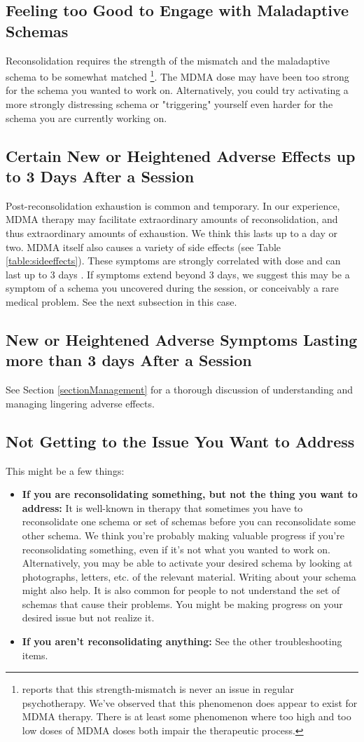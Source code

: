 \documentclass[12pt,letterpaper]{book}
\begin{document}
\subsection*{Feeling too Good to Engage with Maladaptive Schemas}
Reconsolidation requires the strength of the mismatch and the maladaptive schema to be somewhat matched \cite{eckerUnlocking}\footnote{\textcite{eckerUnlocking} reports that this strength-mismatch is never an issue in regular psychotherapy. We've observed that this phenomenon does appear to exist for MDMA therapy. There is at least some phenomenon where too high and too low doses of MDMA doses both impair the therapeutic process.}. The MDMA dose may have been too strong for the schema you wanted to work on. Alternatively, you could try activating a more strongly distressing schema or "triggering" yourself even harder for the schema you are currently working on.
\subsection*{Certain New or Heightened Adverse Effects up to 3 Days After a Session}
Post-reconsolidation exhaustion is common and temporary. In our experience, MDMA therapy may facilitate extraordinary amounts of reconsolidation, and thus extraordinary amounts of exhaustion. We think this lasts up to a day or two. MDMA itself also causes a variety of side effects (see Table \ref{table:sideeffects}). These symptoms are strongly correlated with dose and can last up to 3 days \cite{liechtiGender}. If symptoms extend beyond 3 days, we suggest this may be a symptom of a schema you uncovered during the session, or conceivably a rare medical problem. See the next subsection in this case.
\subsection*{New or Heightened Adverse Symptoms Lasting more than 3 days After a Session}
See Section \ref{sectionManagement} for a thorough discussion of understanding and managing lingering adverse effects.
\subsection*{Not Getting to the Issue You Want to Address}
This might be a few things:
\begin{itemize}
    \item \textbf{If you are reconsolidating something, but not the thing you want to address:} It is well-known in therapy that sometimes you have to reconsolidate one schema or set of schemas before you can reconsolidate some other schema. We think you're probably making valuable progress if you're reconsolidating something, even if it's not what you wanted to work on. Alternatively, you may be able to activate your desired schema by looking at photographs, letters, etc. of the relevant material. Writing about your schema might also help. It is also common for people to not understand the set of schemas that cause their problems. You might be making progress on your desired issue but not realize it.
    \item \textbf{If you aren't reconsolidating anything:} See the other troubleshooting items.
\end{itemize}
\end{document}
